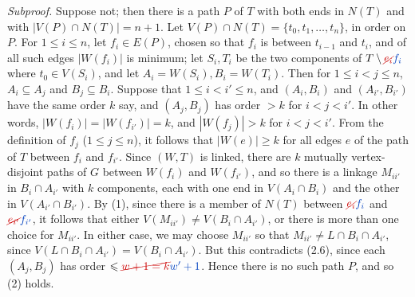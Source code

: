 \textit{Subproof.} Suppose not; then there is a path $P$ of $T$ with both ends in $N(T)$ and with $|V(P) \cap N(T)| = n + 1$. Let $V(P) \cap N(T) = \{t_0, t_1, \dots, t_n\}$, in order on $P$. For $1 \le i \le n$, let $f_i \in E(P)$, chosen so that $f_i$ is between $t_{i-1}$ and $t_i$, and of all such edges $|W(f_i)|$ is minimum; let $S_i, T_i$ be the two components of $T \setminus \delm{e_i}\fix{f_i}$ where $t_0 \in V(S_i)$, and let $A_i = W(S_i), B_i = W(T_i)$. Then for $1 \le i < j \le n$, $A_i \subseteq A_j$ and $B_j \subseteq B_i$. Suppose that $1 \le i < i' \le n$, and $(A_i, B_i)$ and $(A_{i'}, B_{i'})$ have the same order $k$ say, and $(A_j, B_j)$ has order $> k$ for $i < j < i'$. In other words, $|W(f_i)| = |W(f_{i'})| = k$, and $|W(f_j)| > k$ for $i < j < i'$. From the definition of $f_j$ ($1 \le j \le n$), it follows that $|W(e)| \ge k$ for all edges $e$ of the path of $T$ between $f_i$ and $f_{i'}$. Since $(W, T)$ is linked, there are $k$ mutually vertex-disjoint paths of $G$ between $W(f_i)$ and $W(f_{i'})$, and so there is a linkage $M_{ii'}$ in $B_i \cap A_{i'}$ with $k$ components, each with one end in $V(A_i \cap B_i)$ and the other in $V(A_{i'} \cap B_{i'})$. By (1), since there is a member of $N(T)$ between $\delm{e_i}\fix{f_i}$ and $\delm{e_{i'}}\fix{f_{i'}}$, it follows that either $V(M_{ii'}) \ne V(B_i \cap A_{i'})$, or there is more than one choice for $M_{ii'}$. In either case, we may choose $M_{ii'}$ so that $M_{ii'} \ne L \cap B_i \cap A_{i'}$, since $V(L \cap B_i \cap A_{i'}) = V(B_i \cap A_{i'})$. But this contradicts (2.6), since each $(A_j, B_j)$ has order $\le \delm{w + 1 = k}\fix{w' + 1}$. Hence there is no such path $P$, and so (2) holds.

